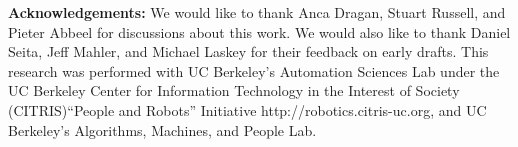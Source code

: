 \documentclass[letterpaper, 10 pt, conference]{ieeeconf}
\begin{document}
{\footnotesize 
\noindent \textbf{Acknowledgements:}
We would like to thank Anca Dragan, Stuart Russell, and Pieter Abbeel for discussions about this work.
We would also like to thank Daniel Seita, Jeff Mahler, and Michael Laskey for their feedback on early drafts.
This research was performed with UC Berkeley's Automation Sciences Lab under the UC Berkeley Center for Information Technology in the Interest of Society (CITRIS)``People and Robots'' Initiative http://robotics.citris-uc.org, and 
UC Berkeley's Algorithms, Machines, and People Lab.}






\appendix

\end{document}
